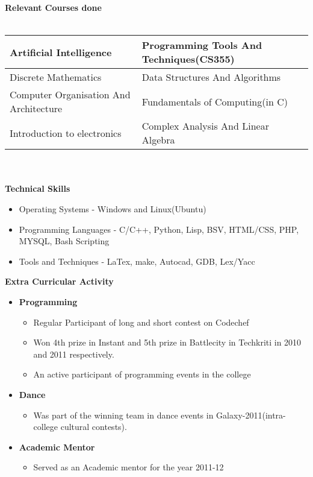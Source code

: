 \documentclass[11pt]{article}
\begin{document}
    {\small
      
      {\normalsize \bf Relevant Courses done}\\ \\
      \begin{tabular}{|p{3.35in}|p{3.3in}|}
        \hline
        Artificial Intelligence &  Programming Tools And Techniques(CS355) \\ \hline
        Discrete Mathematics & Data Structures And Algorithms	\\ \hline
        Computer Organisation And Architecture & Fundamentals of Computing(in C)\\ \hline
        Introduction to electronics & Complex Analysis And Linear Algebra \\ \hline 
      \end{tabular}\\ \\
      
      \newpage 
          { \normalsize \bf Technical Skills}
          \begin{itemize}
	  \item Operating Systems - Windows and Linux(Ubuntu)
	  \item Programming Languages - C/C++, Python, Lisp, BSV, HTML/CSS, PHP, MYSQL, Bash Scripting
	  \item Tools and Techniques - LaTex, make, Autocad, GDB, Lex/Yacc\\
            
          \end{itemize}
          { \normalsize \bf Extra Curricular Activity }
          \begin{itemize}
	  \item {\bf Programming}
	    \begin{itemize}
	    \item Regular Participant of long and short contest on Codechef
	    \item Won 4th prize in Instant and 5th prize in Battlecity in Techkriti in 2010 and 2011 respectively.
	    \item An active participant of programming events in the college
	    \end{itemize}
	  \item {\bf Dance}
	    \begin{itemize}
	    \item Was part of the winning team in dance events in Galaxy-2011(intra-college cultural contests).
	    \end{itemize}
	  \item {\bf Academic Mentor}
	    \begin{itemize}
	    \item Served as an Academic mentor for the year 2011-12
	    \end{itemize}
	    
          \end{itemize}
    }
\end{document}
